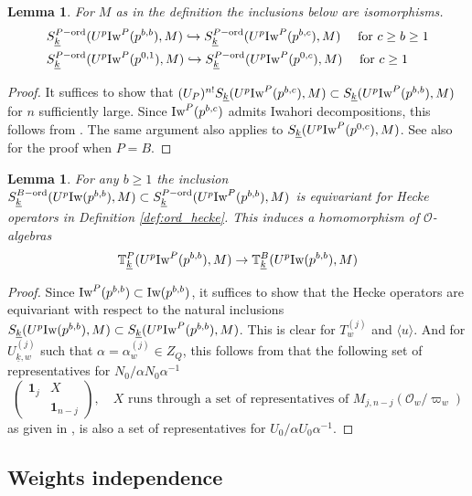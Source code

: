 \documentclass[leqno]{amsart}
\newcommand{\wt}[1]{\underline{ #1 }}
\newcommand{\TT}{\mathbb{T}} %
\newcommand{\Iw}{\textnormal{Iw}}
\newcommand{\ord}{\textnormal{ord}}
\newcommand{\id}{\mathbf{1}}
\newcommand{\oo}{\mathcal{O}} %
\newtheorem{lem}[thm]{Lemma}
\theoremstyle{definition}
\theoremstyle{remark}
\begin{document}
\begin{lem}\label{lem:control}
	For $M$ as in the definition
	the inclusions below are isomorphisms.
	\begin{align*}
	&S_{\wt{k}}^{P-\ord}(U^p\Iw^P(p^{b,b}),M)\hookrightarrow	
	S_{\wt{k}}^{P-\ord}(U^p\Iw^P(p^{b,c}),M)\quad 
	\text{ for } c\geq b\geq 1\\
	&S_{\wt{k}}^{P-\ord}(U^p\Iw^P(p^{0,1}),M)\hookrightarrow	
	S_{\wt{k}}^{P-\ord}(U^p\Iw^P(p^{0,c}),M)\quad \text{ for } c\geq 1
	\end{align*}
\end{lem}
\begin{proof}
	It suffices to show that 
	$(U_P)^{n!}S_{\wt{k}}(U^p\Iw^P(p^{b,c}),M)
	\subset S_{\wt{k}}(U^p\Iw^P(p^{b,b}),M)$
	for $n$ sufficiently large. 
	Since $\Iw^P(p^{b,c})$ admits Iwahori decompositions,
	this follows from \cite[Lem 3.3.2]{emeI}.
	The same argument also applies to 
	$S_{\wt{k}}(U^p\Iw^P(p^{0,c}),M)$.
	See also \cite[Lem 2.19]{ger} for the proof when $P=B$.
\end{proof}

\begin{lem}\label{lem:PtoB}
	For any $b\geq 1$
	the inclusion 
	$S_{\wt{k}}^{B-\ord}(U^p\Iw(p^{b,b}),M)\subset
	S_{\wt{k}}^{P-\ord}(U^p\Iw^P(p^{b,b}),M)$
	is equivariant
	for Hecke operators in 
	Definition \ref{def:ord_hecke}.
	This induces a homomorphism of $\oo$-algebras
	\[
		\TT^P_{\wt{k}}(U^p\Iw^P(p^{b,b}),M)\to
		\TT^B_{\wt{k}}(U^p\Iw(p^{b,b}),M)
	\]
\end{lem}
\begin{proof}
	Since $\Iw^P(p^{b,b})\subset \Iw(p^{b,b})$,
	it suffices to show that the Hecke operators 
	are equivariant with respect to the natural inclusions
	$S_{\wt{k}}(U^p\Iw(p^{b,b}),M)\subset 
	S_{\wt{k}}(U^p\Iw^P(p^{b,b}),M)$.
	This is clear for $T_w^{(j)}$ and $\langle u\rangle$.
	And for  $U_{\wt{k},w}^{(j)}$ such that 
	$\alpha=\alpha_w^{(j)}\in Z_Q$, this follows from that 
	the following set of representatives for 
	$N_0/\alpha N_0\alpha^{-1}$
	\[
	\begin{pmatrix}
		\id_j&X\\&\id_{n-j}
	\end{pmatrix},\quad
	X \text{ runs through a set of representatives of }
	M_{j,n-j}(\oo_w/\varpi_w)
	\]
	as given in \cite[Lem 2.10]{ger}, is also
	a set of representatives for 
	$U_0/\alpha U_0\alpha^{-1}$.
\end{proof}

\subsection{Weights independence}
\end{document}
